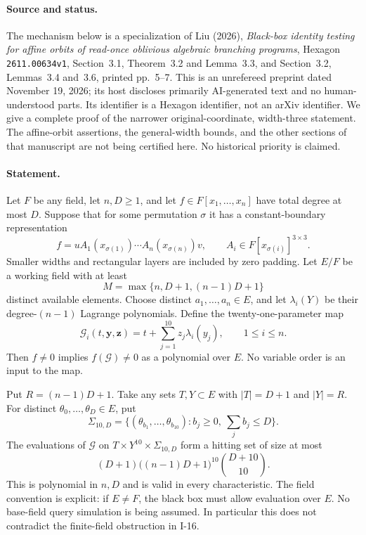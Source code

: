 \paragraph{Source and status.}
The mechanism below is a specialization of Liu (2026),
\emph{Black-box identity testing for affine orbits of read-once
oblivious algebraic branching programs}, Hexagon
\texttt{2611.00634v1}, Section~3.1, Theorem~3.2 and Lemma~3.3,
and Section~3.2, Lemmas~3.4 and~3.6, printed pp.~5--7.
This is an unrefereed preprint dated November 19, 2026; its host
discloses primarily AI-generated text and no human-understood parts.
Its identifier is a Hexagon identifier, not an arXiv identifier.
We give a complete proof of the narrower original-coordinate,
width-three statement.  The affine-orbit assertions, the general-width
bounds, and the other sections of that manuscript are not being
certified here.  No historical priority is claimed.

\paragraph{Statement.}
Let $F$ be any field, let $n,D\ge1$, and let $f\in F[x_1,\ldots,x_n]$
have total degree at most $D$.  Suppose that for some permutation
$\sigma$ it has a constant-boundary representation
\[
 f=uA_1(x_{\sigma(1)})\cdots A_n(x_{\sigma(n)})v,
 \qquad A_i\in F[x_{\sigma(i)}]^{3\times3}.
\]
Smaller widths and rectangular layers are included by zero padding.
Let $E/F$ be a working field with at least
\[
 M=\max\{n,D+1,(n-1)D+1\}
\]
distinct available elements.  Choose distinct $a_1,\ldots,a_n\in E$,
and let $\lambda_i(Y)$ be their degree-$(n-1)$ Lagrange polynomials.
Define the twenty-one-parameter map
\[
 \mathcal G_i(t,\mathbf y,\mathbf z)
   =t+\sum_{j=1}^{10}z_j\lambda_i(y_j),
 \qquad 1\le i\le n.
 \tag{I.22}\label{eq:I-width3-generator}
\]
Then $f\ne0$ implies $f(\mathcal G)\ne0$ as a polynomial over $E$.
No variable order is an input to the map.

Put $R=(n-1)D+1$.  Take any sets $T,Y\subset E$ with
$|T|=D+1$ and $|Y|=R$.  For distinct
$\theta_0,\ldots,\theta_D\in E$, put
\[
 \Sigma_{10,D}=
 \{(\theta_{b_1},\ldots,\theta_{b_{10}}):
       b_j\ge0,\ \sum_j b_j\le D\}.
\]
The evaluations of $\mathcal G$ on
$T\times Y^{10}\times\Sigma_{10,D}$ form a hitting set of size at most
\[
 (D+1)\bigl((n-1)D+1\bigr)^{10}\binom{D+10}{10}.
 \tag{I.23}\label{eq:I-width3-size}
\]
This is polynomial in $n,D$ and is valid in every characteristic.
The field convention is explicit: if $E\ne F$, the black box must
allow evaluation over $E$.  No base-field query simulation is being
assumed.  In particular this does not contradict the finite-field
obstruction in I-16.

